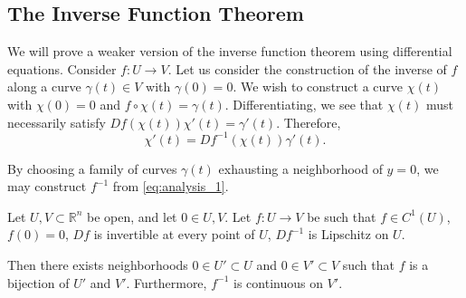 \subsection{The Inverse Function Theorem}

We will prove a weaker version of the inverse function theorem using differential equations. Consider $f: U \to V$. Let us consider the construction of the inverse of $f$ along a curve $\gamma(t) \in V$ with $\gamma(0) = 0$. We wish to construct a curve $\chi(t)$ with $\chi(0) = 0$ and $f\circ \chi (t) = \gamma(t)$. Differentiating, we see that $\chi(t)$ must necessarily satisfy $Df(\chi(t))\chi'(t) = \gamma'(t)$. Therefore, 
\begin{equation}\label{eq:analysis_1}
\chi'(t) = Df^{-1}(\chi(t)) \gamma'(t).
\end{equation}

By choosing a family of curves $\gamma(t)$ exhausting a neighborhood of $y=0$, we may construct $f^{-1}$ from \eqref{eq:analysis_1}.

\begin{proposition}
Let $U, V \subset \mathbb R^n$ be open, and let $0\in U, V$. Let $f: U \to V$ be such that $f\in C^1(U)$, $f(0) = 0$, $Df$ is invertible at every point of $U$, $Df^{-1}$ is Lipschitz on $U$.

Then there exists neighborhoods $0\in U' \subset U$ and $0\in V' \subset V$ such that $f$ is a bijection of $U'$ and $V'$. Furthermore, $f^{-1}$ is continuous on $V'$.
\end{proposition}

